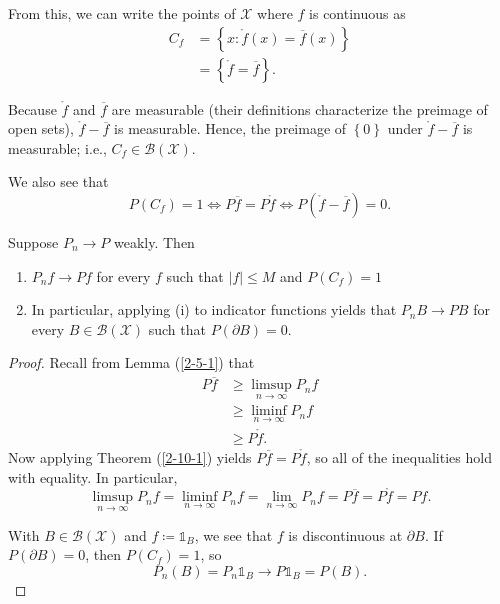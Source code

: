\begin{remark}
	From this, we can write the points of $\mathscr{X}$ where $f$ is continuous as
	\begin{align*}
		C_f &= \left\{x: \mathring{f}(x) = \overline{f}(x)\right\} \\
			&= \left\{\mathring{f} = \overline{f}\right\}
	.\end{align*}

	Because $\mathring{f}$ and $\overline{f}$ are measurable (their definitions characterize the preimage of open sets), $\mathring{f} - \overline{f}$ is measurable. Hence, the preimage of $\left\{0\right\}$ under $\mathring{f} - \overline{f}$ is measurable; i.e., $C_f \in \mathscr{B}(\mathscr{X})$.

	We also see that \[
		P(C_f) = 1 \iff P\overline{f} = P\mathring{f} \iff P\left( \mathring{f} - \overline{f} \right) = 0
	.\] 
\end{remark}

\begin{theorem}
	Suppose $P_n \to P$ weakly. Then 
	\begin{enumerate}[label=(\roman*)]
		\item $P_n f \to Pf$ for every $f$ such that $\left| f  \right| \le M$ and $P(C_f) = 1$
		\item In particular, applying (i) to indicator functions yields that $P_n B \to P B$ for every $B \in \mathscr{B}(\mathscr{X})$ such that $P\left( \partial B \right) = 0$.
	\end{enumerate}
\end{theorem}

\begin{proof}
	Recall from Lemma (\ref{2-5-1}) that \begin{align*}
		P\overline{f} &\ge \limsup\limits_{n \to \infty} P_n f \\
					  &\ge \liminf\limits_{n \to \infty} P_n f \\
					  &\ge P \mathring{f}
	.\end{align*}
	Now applying Theorem (\ref{2-10-1}) yields $P\overline{f} = P \mathring{f}$, so all of the inequalities hold with equality. In particular, \[
		\limsup\limits_{n \to \infty} P_n f = \liminf\limits_{n \to \infty} P_n f = \lim\limits_{n \to \infty} P_n f = P \overline{f} = P \mathring{f} = Pf
	.\]

	With $B \in \mathscr{B}(\mathscr{X})$ and $f \coloneqq \mathds{1}_{B}$, we see that $f$ is discontinuous at $\partial B$. If $P(\partial B) = 0$, then $P (C_f) = 1$, so \[
		P_n(B) = P_n \mathds{1}_{B} \to P \mathds{1}_{B} = P(B)
	.\] 
\end{proof}

